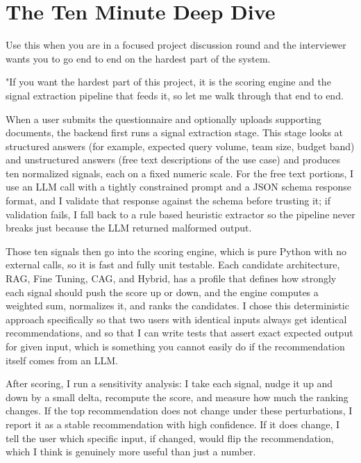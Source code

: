\documentclass[11pt,a4paper]{report}
\begin{document}
\section{The Ten Minute Deep Dive}

Use this when you are in a focused project discussion round and the interviewer wants you to go end to end on the hardest part of the system.

\begin{notebox}
"If you want the hardest part of this project, it is the scoring engine and the signal extraction pipeline that feeds it, so let me walk through that end to end.

When a user submits the questionnaire and optionally uploads supporting documents, the backend first runs a signal extraction stage. This stage looks at structured answers (for example, expected query volume, team size, budget band) and unstructured answers (free text descriptions of the use case) and produces ten normalized signals, each on a fixed numeric scale. For the free text portions, I use an LLM call with a tightly constrained prompt and a JSON schema response format, and I validate that response against the schema before trusting it; if validation fails, I fall back to a rule based heuristic extractor so the pipeline never breaks just because the LLM returned malformed output.

Those ten signals then go into the scoring engine, which is pure Python with no external calls, so it is fast and fully unit testable. Each candidate architecture, RAG, Fine Tuning, CAG, and Hybrid, has a profile that defines how strongly each signal should push the score up or down, and the engine computes a weighted sum, normalizes it, and ranks the candidates. I chose this deterministic approach specifically so that two users with identical inputs always get identical recommendations, and so that I can write tests that assert exact expected output for given input, which is something you cannot easily do if the recommendation itself comes from an LLM.

After scoring, I run a sensitivity analysis: I take each signal, nudge it up and down by a small delta, recompute the score, and measure how much the ranking changes. If the top recommendation does not change under these perturbations, I report it as a stable recommendation with high confidence. If it does change, I tell the user which specific input, if changed, would flip the recommendation, which I think is genuinely more useful than just a number.


\end{notebox}
\end{document}

